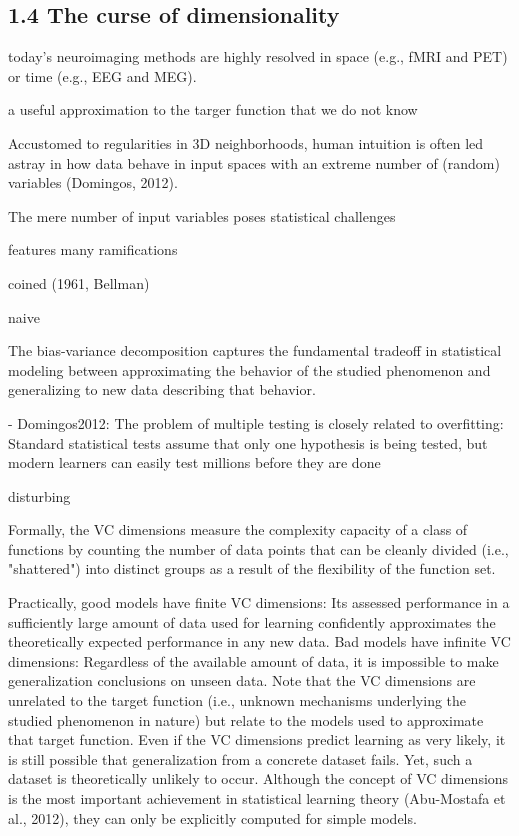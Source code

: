\documentclass[authoryear,review,3p]{elsarticle}
\begin{document}
\subsection*{1.4 The curse of dimensionality}


today's neuroimaging methods are highly resolved in
space (e.g., fMRI and PET)
or
time (e.g., EEG and MEG).


a useful approximation to the targer function that
we do not know


Accustomed to regularities in 3D neighborhoods,
human intuition is often led astray in
how data behave in
input spaces with an extreme number of (random) variables
(Domingos, 2012).


The mere number of input variables poses
statistical challenges

features many ramifications

coined (1961, Bellman)

naive

The bias-variance decomposition captures the fundamental tradeoff in statistical modeling between approximating the behavior of the studied phenomenon and generalizing to new data describing that behavior. 

- Domingos2012: The problem of multiple testing is closely related to overfitting: Standard statistical tests assume that only one hypothesis is being tested, but modern learners can easily test millions before they are done

disturbing

Formally, the VC dimensions measure the complexity capacity of a class of functions by counting the number of data points that can be cleanly divided (i.e., "shattered") into distinct groups as a result of the flexibility of the function set. 

Practically, good models have finite VC dimensions: Its assessed performance in a sufficiently large amount of data used for learning confidently approximates the theoretically expected performance in any new data. Bad models have infinite VC dimensions: Regardless of the available amount of data, it is impossible to make generalization conclusions on unseen data. Note that the VC dimensions are unrelated to the target function (i.e., unknown mechanisms underlying the studied phenomenon in nature) but relate to the models used to approximate that target function. Even if the VC dimensions predict learning as very likely, it is still possible that generalization from a concrete dataset fails. Yet, such a dataset is theoretically unlikely to occur. Although the concept of VC dimensions is the most important achievement in statistical learning theory (Abu-Mostafa et al., 2012), they can only be explicitly computed for simple models.
\end{document}
